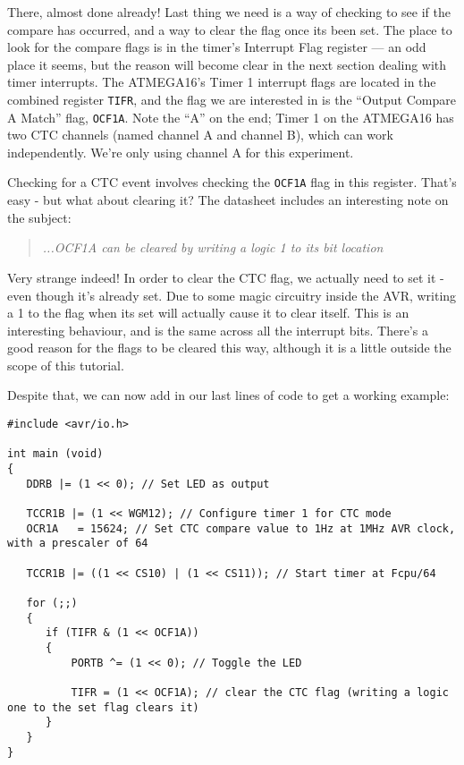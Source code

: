 \documentclass[a4paper,oneside,notitlepage]{book}
\begin{document}
There, almost done already! Last thing we need is a way of checking to see if the compare has occurred, and a way to clear the flag once its been set. The place to look for the compare flags is in the timer's Interrupt Flag register --- an odd place it seems, but the reason will become clear in the next section dealing with timer interrupts. The ATMEGA16's Timer 1 interrupt flags are located in the combined register \texttt{TIFR}, and the flag we are interested in is the ``Output Compare A Match'' flag, \texttt{OCF1A}. Note the ``A'' on the end; Timer 1 on the ATMEGA16 has two CTC channels (named channel A and channel B), which can work independently. We're only using channel A for this experiment.

Checking for a CTC event involves checking the \texttt{OCF1A} flag in this register. That's easy - but what about clearing it? The datasheet includes an interesting note on the subject:

\begin{quote}
\emph{...OCF1A can be cleared by writing a logic 1 to its bit location}
\end{quote}

Very strange indeed! In order to clear the CTC flag, we actually need to set it - even though it's already set. Due to some magic circuitry inside the AVR, writing a 1 to the flag when its set will actually cause it to clear itself. This is an interesting behaviour, and is the same across all the interrupt bits. There's a good reason for the flags to be cleared this way, although it is a little outside the scope of this tutorial.

Despite that, we can now add in our last lines of code to get a working example:

\begin{center}
\begin{lstlisting}
#include <avr/io.h>

int main (void)
{
   DDRB |= (1 << 0); // Set LED as output

   TCCR1B |= (1 << WGM12); // Configure timer 1 for CTC mode
   OCR1A   = 15624; // Set CTC compare value to 1Hz at 1MHz AVR clock, with a prescaler of 64

   TCCR1B |= ((1 << CS10) | (1 << CS11)); // Start timer at Fcpu/64

   for (;;)
   {
      if (TIFR & (1 << OCF1A))
      {
          PORTB ^= (1 << 0); // Toggle the LED

          TIFR = (1 << OCF1A); // clear the CTC flag (writing a logic one to the set flag clears it)
      }
   }
}
\end{lstlisting}
\end{center}
\end{document}
